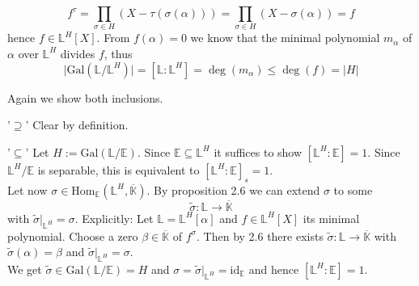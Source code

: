 \documentclass[12pt]{book}
\begin{document}
\begin{spacing}{1.3}
\begin{compactenum}
\begin{compactitem}
$$f^{\tau}=\prod_{\sigma \in H} \left(X- \tau\left(\sigma(\alpha)\right)\right)=\prod_{\sigma \in H} \left(X- \sigma(\alpha)\right)=f$$
hence $f \in \mathbb{L}^H[X]$. From $f(\alpha)=0$ we know that the minimal polynomial $m_{\alpha}$ of $\alpha$ over $\mathbb{L}^H$ divides $f$, thus 
$$ \vert \textrm{Gal}(\mathbb{L}/\mathbb{L}^H) \vert = [\mathbb{L}:\mathbb{L}^H] = \deg(m_{\alpha}) \leqslant \deg(f)= \vert H \vert $$
\end{compactitem}
\item Again we show both inclusions.
\begin{compactitem}
\item['$\supseteq$'] Clear by definition.
\item['$\subseteq$'] Let $H:= \textrm{Gal}(\mathbb{L}/\mathbb{E})$. Since $\mathbb{E} \subseteq \mathbb{L}^H$ it suffices to show $[\mathbb{L}^{H}:\mathbb{E}]=1$. Since $\mathbb{L}^{H}/\mathbb{E}$ is separable, this is equivalent to $[\mathbb{L}^H:\mathbb{E}]_s=1$.\\
Let now $\sigma \in \textrm{Hom}_{\mathbb{E}}(\mathbb{L}^H, \overline{\mathbb{K}})$. By proposition 2.6 we can extend $\sigma$ to some $$\tilde{\sigma}: \mathbb{L} \longrightarrow \overline{\mathbb{K}}$$ with $\tilde{\sigma}|_{\mathbb{L}^H}=\sigma$. Explicitly: Let $\mathbb{L}=\mathbb{L}^H[\alpha]$ and $f \in \mathbb{L}^H[X]$ its minimal polynomial. Choose a zero $\beta \in \overline{\mathbb{K}}$ of $f^{\sigma}$. Then by 2.6 there exists $\tilde{\sigma}: \mathbb{L} \longrightarrow \overline{\mathbb{K}}$ with $\tilde{\sigma}(\alpha)=\beta$ and $\tilde{\sigma}|_{\mathbb{L}^H} = \sigma$.\\
We get $\tilde{\sigma} \in \textrm{Gal}(\mathbb{L}/\mathbb{E})=H$ and $\sigma=\tilde{\sigma}|_{\mathbb{L}^H}=\textrm{id}_{\mathbb{E}}$ and hence $[\mathbb{L}^H:\mathbb{E}]=1$.
\end{compactitem}
\end{compactenum}


\end{spacing}
\end{document}
